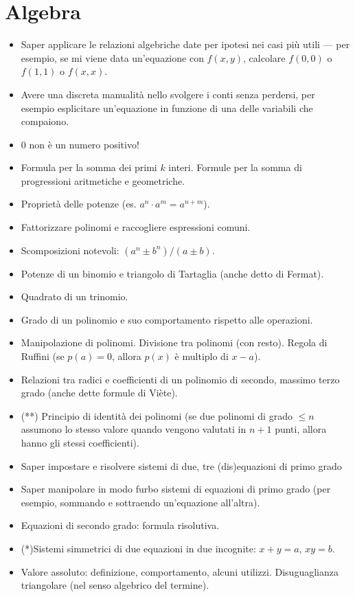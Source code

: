 \documentclass[a4paper,10pt]{paper}
\renewcommand{\star}{(*)}
\newcommand{\sstar}{(**)}
\begin{document}
\section{Algebra}
\begin{itemize}
 \item Saper applicare le relazioni algebriche date per ipotesi nei casi più utili --- per esempio, se mi viene data un'equazione con $f(x,y)$, calcolare $f(0,0)$ o $f(1,1)$ o $f(x,x)$.
 \item Avere una discreta manualità nello svolgere i conti senza perdersi, per esempio esplicitare un'equazione in funzione di una delle variabili che compaiono.
 \item $0$ non è un numero positivo!
 \item Formula per la somma dei primi $k$ interi. Formule per la somma di progressioni aritmetiche e geometriche.
 \item Proprietà delle potenze (es. $a^n\cdot a^m = a^{n+m}$).
 \item Fattorizzare polinomi e raccogliere espressioni comuni.
 \item Scomposizioni notevoli: $(a^n \pm b^n) / (a\pm b)$.
 \item Potenze di un binomio e triangolo di Tartaglia (anche detto di Fermat).
 \item Quadrato di un trinomio.
 \item Grado di un polinomio e suo comportamento rispetto alle operazioni.
 \item Manipolazione di polinomi. Divisione tra polinomi (con resto). Regola di Ruffini (se $p(a)=0$, allora $p(x)$ è multiplo di $x-a$).
 \item Relazioni tra radici e coefficienti di un polinomio di secondo, massimo terzo grado (anche dette formule di Viète).
 \item \sstar{} Principio di identità dei polinomi (se due polinomi di grado $\leq n$ assumono lo stesso valore quando vengono valutati in $n+1$ punti, allora hanno gli stessi coefficienti).
 \item Saper impostare e risolvere sistemi di due, tre (dis)equazioni di primo grado
 \item Saper manipolare in modo furbo sistemi di equazioni di primo grado (per esempio, sommando e sottraendo un'equazione all'altra).
 \item Equazioni di secondo grado: formula risolutiva.
 \item \star Sistemi simmetrici di due equazioni in due incognite: $x+y=a$, $xy=b$.
 \item Valore assoluto: definizione, comportamento, alcuni utilizzi. Disuguaglianza triangolare (nel senso algebrico del termine).

\end{itemize}
\end{document}

